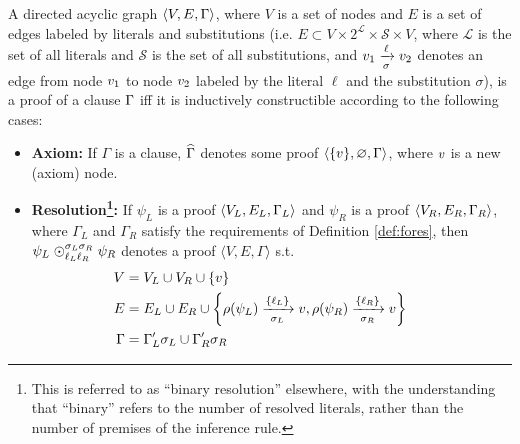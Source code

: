 \begin{definition} 
\label{def:proof}%
A directed acyclic graph $\langle V, E, \clause \rangle$, where $V$ is a set of nodes and $E$ is a
set of edges labeled by literals and substitutions (i.e. $E \subset V \times 2^{\mathcal{L}} \times \mathcal{S} \times V$, where $\mathcal{L}$ is the set of all literals and $\mathcal{S}$ is the set of all substitutions, and $\n_1
\xrightarrow[\sigma]{\ell} \n_2$ denotes an edge from node $\n_1$ to node $\n_2$ labeled by the literal $\ell$ and the substitution $\sigma$), is a
proof of a clause $\clause$ iff it is inductively constructible according to the following cases:
%
\begin{itemize}
  \item \textbf{Axiom:} If $\Gamma$ is a clause, $\axiom{\Gamma}$ denotes some proof $\langle \{ \n \}, \varnothing,
    \Gamma \rangle$, where $\n$ is a new (axiom) node.
  \item \textbf{Resolution\footnote{This is referred to as ``binary resolution'' elsewhere, with the understanding that ``binary'' refers to the number of resolved literals, rather than the number of premises of the inference rule.}:} If $\psi_L$ is a proof $\langle V_L, E_L, \clause_L \rangle$ and
    $\psi_R$ is a proof $\langle V_R, E_R, \clause_R \rangle$, where $\Gamma_L$ and $\Gamma_R$ satisfy the requirements of Definition \ref{def:fores},
    then
    $\psi_L \res{\ell_L}{\sigma_L}{\ell_R}{\sigma_R} \psi_R$ denotes a proof $\langle V, E, \Gamma \rangle$ s.t.
    \begin{align*}
     \hspace{-0.6cm} V &= V_L \cup V_R \cup \{\n \}    \\
      \hspace{-0.6cm} E &= E_L \cup E_R \cup 
                    \left\{ \raiz{\psi_L} \xrightarrow[\sigma_L]{\{\ell_L\} } \n, 
                            \raiz{\psi_R} \xrightarrow[\sigma_R]{\{\ell_R\} } \n \right\}    \\
    \hspace{-0.6cm}  \Gamma &= \clause_L' \sigma_L \cup  \clause_R' \sigma_R
    \end{align*}

\end{itemize}
\end{definition}
